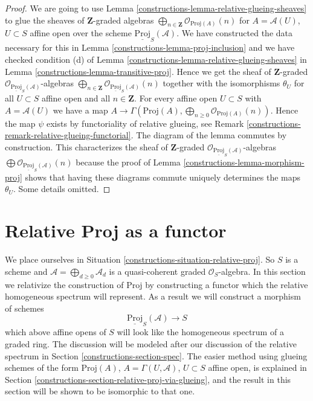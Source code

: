 \begin{proof}

We are going to use Lemma \ref{constructions-lemma-relative-glueing-sheaves}
to glue the sheaves of $\mathbf{Z}$-graded algebras
$\bigoplus_{n \in \mathbf{Z}} \mathcal{O}_{\text{Proj}(A)}(n)$
for $A = \mathcal{A}(U)$, $U \subset S$ affine open
over the scheme $\underline{\text{Proj}}_S(\mathcal{A})$.
We have constructed the data necessary for this in
Lemma \ref{constructions-lemma-proj-inclusion} and we have checked condition (d) of
Lemma \ref{constructions-lemma-relative-glueing-sheaves} in
Lemma \ref{constructions-lemma-transitive-proj}. Hence we get the
sheaf of $\mathbf{Z}$-graded
$\mathcal{O}_{\underline{\text{Proj}}_S(\mathcal{A})}$-algebras
$\bigoplus_{n \in \mathbf{Z}}
\mathcal{O}_{\underline{\text{Proj}}_S(\mathcal{A})}(n)$
together with the isomorphisms $\theta_U$ for all
$U \subset S$ affine open and all $n \in \mathbf{Z}$.
For every affine open $U \subset S$ with $A = \mathcal{A}(U)$ we have a map
$A \to \Gamma(\text{Proj}(A),
\bigoplus_{n \geq 0} \mathcal{O}_{\text{Proj}(A)}(n))$.
Hence the map $\psi$ exists by functoriality
of relative glueing, see Remark \ref{constructions-remark-relative-glueing-functorial}.
The diagram of the lemma commutes by construction.
This characterizes the sheaf of $\mathbf{Z}$-graded
$\mathcal{O}_{\underline{\text{Proj}}_S(\mathcal{A})}$-algebras
$\bigoplus \mathcal{O}_{\underline{\text{Proj}}_S(\mathcal{A})}(n)$
because the proof of Lemma \ref{constructions-lemma-morphism-proj} shows that
having these diagrams commute uniquely determines the maps $\theta_U$.
Some details omitted.
\end{proof}

\section{Relative Proj as a functor}
\label{constructions-section-relative-proj}
We place ourselves in Situation \ref{constructions-situation-relative-proj}.
So $S$ is a scheme and $\mathcal{A} = \bigoplus_{d \geq 0} \mathcal{A}_d$
is a quasi-coherent graded $\mathcal{O}_S$-algebra.
In this section we relativize the construction of
$\text{Proj}$ by constructing a functor which the relative
homogeneous spectrum will represent.
As a result we will construct a morphism of schemes
$$
\underline{\text{Proj}}_S(\mathcal{A}) \longrightarrow S
$$
which above affine opens of $S$ will look like the homogeneous spectrum
of a graded ring. The discussion will be modeled after our
discussion of the relative spectrum in Section \ref{constructions-section-spec}.
The easier method using glueing schemes of the form
$\text{Proj}(A)$, $A = \Gamma(U, \mathcal{A})$, $U \subset S$
affine open, is explained in Section \ref{constructions-section-relative-proj-via-glueing},
and the result in this section will be shown to be isomorphic to that one.

